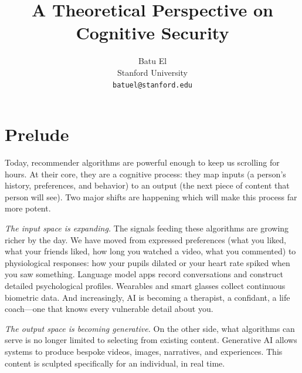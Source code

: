 \documentclass{article}
\title{A Theoretical Perspective on Cognitive Security}
\author{%
 Batu El\\
  Stanford University\\
  \texttt{batuel@stanford.edu} \\
}
\begin{document}
\maketitle
\begin{abstract}

\end{abstract}

\section{Prelude}

Today, recommender algorithms are powerful enough to keep us scrolling for hours. At their core, they are a cognitive process: they map inputs (a person's history, preferences, and behavior) to an output (the next piece of content that person will see). Two major shifts are happening which will make this process far more potent.

\textit{The input space is expanding.} The signals feeding these algorithms are growing richer by the day. We have moved from expressed preferences (what you liked, what your friends liked, how long you watched a video, what you commented) to physiological responses: how your pupils dilated or your heart rate spiked when you saw something. Language model apps record conversations and construct detailed psychological profiles. Wearables and smart glasses collect continuous biometric data. And increasingly, AI is becoming a therapist, a confidant, a life coach—one that knows every vulnerable detail about you.

\textit{The output space is becoming generative.} On the other side, what algorithms can serve is no longer limited to selecting from existing content. Generative AI allows systems to produce bespoke videos, images, narratives, and experiences. This content is sculpted specifically for an individual, in real time.
\end{document}
